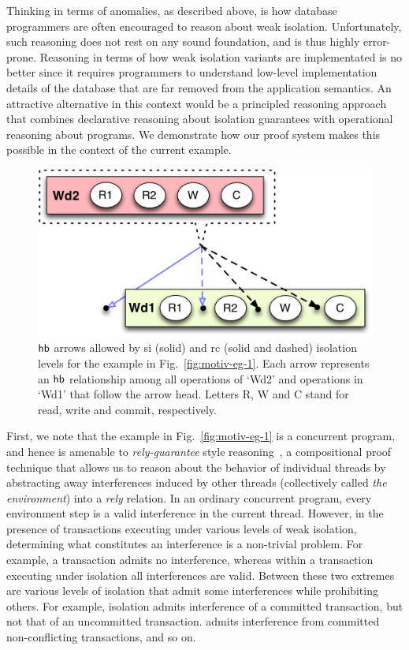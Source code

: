 Thinking in terms of anomalies, as described above, is how database
programmers are often encouraged to reason about weak isolation.
Unfortunately, such reasoning does not rest on any sound foundation,
and is thus highly error-prone. Reasoning in terms of how weak
isolation variants are implementated is no better since it requires
programmers to understand low-level implementation details of the
database that are far removed from the application semantics. An
attractive  alternative in this context would be a principled
reasoning approach that combines declarative reasoning about isolation
guarantees with operational reasoning about programs. We demonstrate
how our proof system makes this possible in the context of the current
example.

\begin{figure}
\centering
  \includegraphics[scale=0.4]{Figures/motiv-eg-1-hb}

\caption{\small $\textsf{hb}$ arrows allowed by {\sc si} (solid) and {\sc rc} (solid
  and dashed) isolation levels for the example in
  Fig.~\ref{fig:motiv-eg-1}. Each arrow represents an $\textsf{hb}$ relationship
  among all operations of `Wd2' and operations in `Wd1' that follow
  the arrow head. Letters R, W and C stand for read, write and commit,
  respectively.}
\label{fig:motiv-eg-1-hb}
\vspace*{-8pt}
\end{figure}

First, we note that the example in Fig.~\ref{fig:motiv-eg-1} is a
concurrent program, and hence is amenable to \emph{rely-guarantee}
style reasoning~\cite{rgjones}, a compositional proof technique that
allows us to reason about the behavior of individual threads by
abstracting away interferences induced by other threads (collectively
called \emph{the environment}) into a \emph{rely} relation. In an
ordinary concurrent program, every environment step is a valid
interference in the current thread. However, in the presence of
transactions executing under various levels of weak isolation,
determining what constitutes an interference is a non-trivial problem.
For example, a  transaction admits no interference,
whereas within a transaction executing under 
isolation all interferences are valid. Between these two extremes are
various levels of isolation that admit some interferences while
prohibiting others. For example,  isolation admits
interference of a committed transaction, but not that of an
uncommitted transaction.  admits interference
from committed non-conflicting transactions, and so on.

